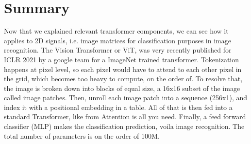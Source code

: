 \documentclass[pdftex,11pt,titlepage,twoside,openright]{report}
\begin{document}
\newpage


%
%
\cleardoublepage
\chapter{Summary}

Now that we explained relevant transformer components, we can see how it applies to 2D signals, i.e. image matrices for classification purposes in image recognition.
The Vision Transformer or ViT, was very recently published for ICLR 2021 by a google team for a ImageNet trained transformer.
Tokenization happens at pixel level, so each pixel would have to attend to  each other pixel in the grid, which becomes too heavy to compute, on the order of. 
To resolve that, the image is broken down into blocks of equal size, a 16x16 subset of the image called image patches. Then, unroll each image patch into a sequence (256x1), and index it with a positional embedding in a table. All of that is then fed into a standard Transformer, like from Attention is all you need. Finally, a feed forward classifier (MLP) makes the classification prediction, voila image recognition.
The total number of parameters is on the order of 100M.

\newpage


%
%

\cleardoublepage
{} %
\pagestyle{plain}





\end{document}
